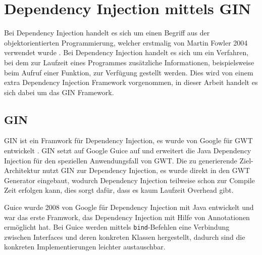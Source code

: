\section{Dependency Injection mittels GIN} \label{GIN}
Bei Dependency Injection handelt es sich um einen Begriff aus der
objektorientierten Programmierung, welcher erstmalig von Martin Fowler 2004
verwendet wurde \cite{bib:DI}. Bei Dependency Injection handelt es sich um
ein Verfahren, bei dem zur Laufzeit eines Programmes zusätzliche Informationen,
beispielsweise beim Aufruf einer Funktion, zur Verfügung gestellt werden. Dies
wird von einem extra Dependency Injection Framework vorgenommen, in dieser
Arbeit handelt es sich dabei um das GIN Framework.

\subsection{GIN}
GIN ist ein Framwork für Dependency Injection, es wurde von Google
für GWT entwickelt \cite[GIN]{bib:gin}. GIN setzt auf Google Guice
\cite[Guice]{bib:guice} auf und erweitert die Java Dependency Injection für den
speziellen Anwendungsfall von GWT. Die zu generierende Ziel-Architektur nutzt
GIN zur Dependency Injection, es wurde direkt in den GWT Generator eingebaut,
wodurch Dependency Injection teilweise schon zur Compile Zeit erfolgen kann,
dies sorgt dafür, dass es kaum Laufzeit Overhead gibt.

Guice wurde 2008 von Google für Dependency Injection mit Java entwickelt und war
das erste Framwork, das Dependency Injection mit Hilfe von Annotationen
ermöglicht hat. Bei Guice werden mittels \texttt{bind}-Befehlen eine Verbindung
zwischen Interfaces und deren konkreten Klassen hergestellt, dadurch sind die konkreten
Implementierungen leichter austauschbar.

